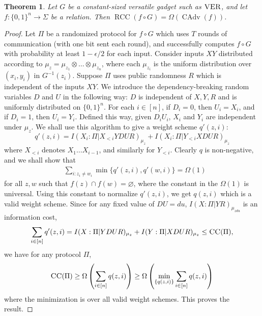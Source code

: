 \documentclass[10pt,a4paper]{article}
\newtheorem{theorem}{Theorem}
\theoremstyle{definition}
\newcommand{\B}{\{0,1\}}
\newcommand{\CC}{\textsc{CC}}
\renewcommand{\>}{\rangle}
\newcommand{\<}{\langle}
\DeclareMathOperator{\CAdv}{CAdv}
\DeclareMathOperator{\RCC}{RCC}
\begin{document}
\begin{theorem}
Let $G$ be a constant-sized versatile gadget such as
$\textsc{VER}$, and let $f\colon\B^n\to\Sigma$ be a relation.
Then $\RCC(f\circ G) =\Omega(\CAdv(f))$.
\end{theorem}

\begin{proof}
Let $\Pi$ be a randomized protocol for $f\circ G$ which uses $T$ rounds
of communication (with one bit sent each round), and successfully computes $f\circ G$ with probability at least $1-\epsilon/2$ for each input. Consider inputs $XY$ distributed according to $\mu_z = \mu_{z_1}\otimes\ldots\otimes\mu_{z_n}$, where each $\mu_{z_i}$ is the uniform distribution over $(x_i,y_i)$ in $G^{-1}(z_i)$. Suppose $\Pi$ uses public randomness $R$ which is independent of the inputs $XY$. We introduce the dependency-breaking random variables $D$ and $U$ \cite{BJKS04} in the following way: $D$ is independent of $X, Y, R$ and is uniformly distributed on $\B^n$. For each $i \in [n]$, if $D_i=0$, then $U_i = X_i$, and if $D_i=1$, then $U_i=Y_i$. Defined this way, given $D_iU_i$, $X_i$ and $Y_i$ are independent under $\mu_z$. We shall use this algorithm to give a weight scheme $q'(z,i)$:
\[q'(z,i)=I(X_i:\Pi|X_{<i} YDUR)_{\mu_z} + I(X_i:\Pi|Y_{<i}XDUR)_{\mu_z}\]
where $X_{<i}$ denotes $X_1\ldots X_{i-1}$, and similarly for $Y_{<i}$. Clearly $q$ is non-negative, and we shall show that
\begin{align*}
& \sum_{i:z_i\neq w_i}\min\{q'(z,i),q'(w,i)\} = \Omega(1)
\end{align*}
for all $z,w$ such that $f(z) \cap f(w) = \varnothing$, where the constant in the $\Omega(1)$ is universal. Using this constant to normalize $q'(z,i)$, we get $q(z,i)$ which is a valid weight scheme. Since for any fixed value of $DU=du$, $I(X:\Pi|YR)_{\mu_{zdu}}$ is an information cost,
\[ \sum_{i \in [n]}q'(z,i) = I(X:\Pi|YDUR)_{\mu_z} + I(Y:\Pi|XDUR)_{\mu_z} \leq \CC(\Pi),\]
we have for any protocol $\Pi$,
\[ \CC(\Pi) \geq \Omega\left(\sum_{i \in [n]}q(z,i)\right) \geq \Omega\left(\min_{\{q(z,i)\}}\sum_{i \in [n]}q(z,i)\right) \]
where the minimization is over all valid weight schemes. This proves the result.


\end{proof}
\end{document}
